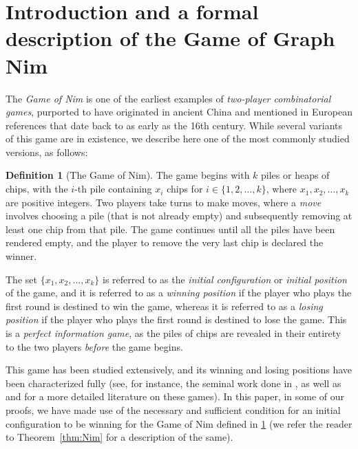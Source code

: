 \documentclass[11pt,reqno]{amsart}
\theoremstyle{definition}
\newtheorem{defn}[theorem]{Definition}
\theoremstyle{definition}
\begin{document}
\section{Introduction and a formal description of the Game of Graph Nim}\label{sec:intro}
The \emph{Game of Nim} is one of the earliest examples of \emph{two-player combinatorial games}, purported to have originated in ancient China and mentioned in European references that date back to as early as the 16th century. While several variants of this game are in existence, we describe here one of the most commonly studied versions, as follows:
\begin{defn}[The Game of Nim]\label{defn:nim}
The game begins with $k$ piles or heaps of chips, with the $i$-th pile containing $x_{i}$ chips for $i \in \{1,2,\ldots,k\}$, where $x_{1}, x_{2}, \ldots, x_{k}$ are positive integers. Two players take turns to make moves, where a \emph{move} involves choosing a pile (that is not already empty) and subsequently removing at least one chip from that pile. The game continues until all the piles have been rendered empty, and the player to remove the very last chip is declared the winner.
\end{defn}
The set $\{x_{1},x_{2},\ldots,x_{k}\}$ is referred to as the \emph{initial configuration} or \emph{initial position} of the game, and it is referred to as a \emph{winning position} if the player who plays the first round is destined to win the game, whereas it is referred to as a \emph{losing position} if the player who plays the first round is destined to lose the game. This is a \emph{perfect information game}, as the piles of chips are revealed in their entirety to the two players \emph{before} the game begins.

This game has been studied extensively, and its winning and losing positions have been characterized fully (see, for instance, the seminal work done in \cite{bouton1901nim}, as well as \cite{conway2000numbers} and \cite{ferguson2020course} for a more detailed literature on these games). In this paper, in some of our proofs, we have made use of the necessary and sufficient condition for an initial configuration to be winning for the Game of Nim defined in \ref{defn:nim} (we refer the reader to Theorem~\ref{thm:Nim} for a description of the same).
\end{document}
